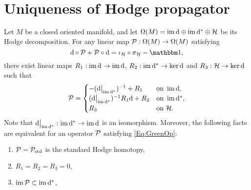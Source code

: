 \documentclass[\MainFolder/Text.tex]{subfiles}
\begin{document}
\section{Uniqueness of Hodge propagator}\label{Sec:TZ}
\allowdisplaybreaks
\begin{Proposition}\label{Prop:UniHO}
Let $M$ be a closed oriented manifold, and let $\Omega(M)=\operatorname{im}\mathrm{d}\oplus\operatorname{im}\mathrm{d}^*\oplus\mathcal{H}$ be its Hodge decomposition. For any linear map $\mathcal{P}:\Omega(M)\rightarrow\Omega(M)$ satisfying
\begin{equation}\label{Eq:GreenOp}
\Dd\circ\Htp + \Htp\circ\Dd = \iota_\Harm\circ\pi_\Harm - \Id,
\end{equation}
there exist linear maps $R_1: \operatorname{im} \mathrm{d} \rightarrow \operatorname{im} \mathrm{d}$, $R_2: \operatorname{im} \mathrm{d}^* \rightarrow \operatorname{ker} \mathrm{d}$ and $R_3: \mathcal{H} \rightarrow \operatorname{ker} \mathrm{d}$ such that
\begin{equation} \label{Eq:GreenOpForm}
\Htp = \begin{cases}
 -(\Restr{\Dd}{\Im\CoDd})^{-1} + R_1 & \text{on }\Im \Dd, \\
 (\Restr{\Dd}{\Im\CoDd})^{-1} R_1 \Dd + R_2 & \text{on } \Im \CoDd, \\
 R_3 & \text{on }\Harm.
\end{cases}
\end{equation}
Note that $\Restr{\Dd}{\Im \CoDd} : \Im \CoDd \rightarrow \Im \Dd$ is an isomorphism.
Moreover, the following facts are equivalent for an operator $\mathcal{P}$ satisfying \eqref{Eq:GreenOp}:
\begin{enumerate}[label=(\arabic*)]
\item $\mathcal{P} = \mathcal{P}_{\mathrm{std}}$ is the standard Hodge homotopy,
\item $R_1 = R_2 = R_3 = 0$,
\item $\operatorname{im}\mathcal{P}\subset\operatorname{im}\mathrm{d}^*$, 
\end{enumerate}
\end{Proposition}
\end{document}
